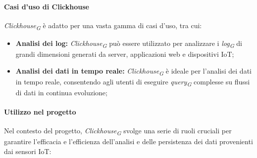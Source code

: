 \paragraph{Casi d'uso di Clickhouse}
\textit{Clickhouse}\textsubscript{\textit{G}} è adatto per una vasta gamma di casi d'uso, tra cui:
\begin{itemize}
    \item \textbf{Analisi dei log:} \textit{Clickhouse}\textsubscript{\textit{G}} può essere utilizzato per analizzare i \textit{log}\textsubscript{\textit{G}} di grandi dimensioni generati da server, applicazioni web e dispositivi IoT;
    \item \textbf{Analisi dei dati in tempo reale:} \textit{Clickhouse}\textsubscript{\textit{G}} è ideale per l'analisi dei dati in tempo reale, consentendo agli utenti di eseguire \textit{query}\textsubscript{\textit{G}} complesse su flussi di dati in continua evoluzione;
\end{itemize}

\paragraph{Utilizzo nel progetto}
Nel contesto del progetto, \textit{Clickhouse}\textsubscript{\textit{G}} svolge una serie di ruoli cruciali per garantire l'efficacia e l'efficienza dell'analisi e delle persistenza dei dati provenienti dai sensori IoT:

